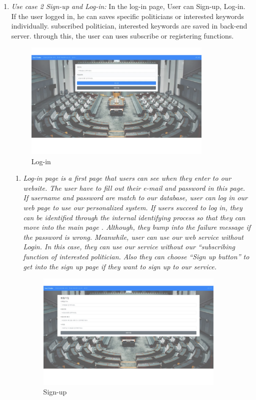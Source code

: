 \documentclass[conference]{IEEEtran}
\begin{document}
\begin{enumerate}
\item \textit{Use case 2 Sign-up and Log-in: } In the log-in page, User can Sign-up, Log-in. If the user logged in, he can saves specific politicians or interested keywords individually. subscribed politician, interested keywords are saved in back-end server. through this, the user can uses subscribe or registering functions.\\

\begin{figure}[htbp]
\centerline{\includegraphics[width=90mm,scale=0.5]{fig/usecase3.png}}
\caption{Log-in}
\label{fig}
\end{figure}

\begin{enumerate}
    \item\textit{Log-in page is a first page that users can see when they enter to our website. The user have to fill out their e-mail and password in this page.  If username and password are match to our database, user can log in our web page to use our personalized system. If users succeed to log in, they can be identified through the internal identifying process so that they can move into the main page . Although, they bump into the failure message if the password is wrong. Meanwhile, user can use our web service without Login. In this case, they can use our service without our “subscribing function of interested politician. Also they can choose “Sign up button” to get into the sign up page  if they want to sign up to our service.
} \\

\begin{figure}[htbp]
\centerline{\includegraphics[width=90mm,scale=0.5]{fig/usecase4.png}}
\caption{Sign-up}
\label{fig}
\end{figure}


\end{enumerate}
\end{enumerate}
\end{document}
